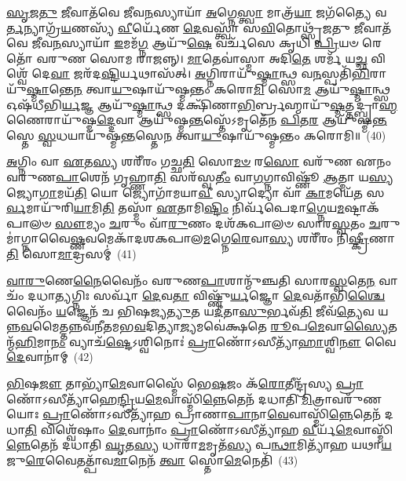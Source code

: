 \-\ul{𑌸𑍃}\-\-\ul{𑌜}\-\-\ul{𑌤𑍁} \ul{𑌜𑍀}\-𑌵𑌾𑌤᳴𑌵𑍇 𑌜𑍀𑌵\-\ul{𑌨}\-𑌸𑍍𑌯𑌾𑌯𑌾᳴ \ul{𑌅}\-𑌗𑍍𑌨𑍇\-\ul{𑌸𑍍𑌤𑍍𑌵𑌾} 𑌮𑌾𑌤𑍍𑌰᳴\-\ul{𑌯𑌾} 𑌜𑌗᳴𑌤𑍍𑌯𑍈 𑌵\-\ul{𑌰𑍍𑌤}\-𑌨𑍍𑌯𑌾𑌗𑍍𑌰᳴\-\ul{𑌯}\-𑌣𑌸𑍍𑌯᳴ \ul{𑌵𑍀}\-𑌰𑍍𑌯𑍇᳴𑌣 \ul{𑌦𑍇}\-𑌵𑌸𑍍𑌤𑍍𑌵𑌾᳴ 𑌸\-\ul{𑌵𑌿}\-𑌤𑍋𑌥𑍍𑌸𑍃᳴𑌜𑌤𑍁 \ul{𑌜𑍀}\-𑌵𑌾𑌤᳴𑌵𑍇 𑌜𑍀𑌵\-\ul{𑌨}\-𑌸𑍍𑌯𑌾𑌯𑌾᳴ \ul{𑌇}\-𑌮𑌮᳴\-\ul{𑌗𑍍𑌨} 𑌆𑌯𑍁᳴\-\ul{𑌷𑍇} 𑌵𑌰𑍍𑌚᳴𑌸𑍇 𑌕𑍃𑌧𑌿 \ul{𑌪𑍍𑌰𑌿}\-𑌯𑍞 𑌰𑍇𑌤𑍋᳴ 𑌵𑌰𑍁𑌣 𑌸𑍋𑌮 𑌰𑌾𑌜𑌨𑍍𑌨𑍍। \ul{𑌮𑌾}\-𑌤𑍇𑌵𑌾॑𑌸𑍍𑌮𑌾 𑌅𑌦𑌿\-\ul{𑌤𑍇} 𑌶𑌰𑍍𑌮᳴ 𑌯\-\ul{𑌚𑍍𑌛} 𑌵𑌿𑌶𑍍𑌵𑍇᳴ 𑌦𑍇\-\ul{𑌵𑌾} 𑌜𑌰᳴𑌦\-\ul{𑌷𑍍𑌟𑌿}\-𑌰𑍍𑌯𑌥𑌾𑌸᳴𑌤𑍍। \ul{𑌅}\-𑌗𑍍𑌨𑌿𑌰𑌾𑌯𑍁᳴\-\ul{𑌷𑍍𑌮𑌾}\-𑌨𑍍𑌥𑍍𑌸 𑌵\-\ul{𑌨}\-𑌸𑍍𑌪𑌤𑌿᳴\-\ul{𑌭𑌿}\-𑌰𑌾𑌯𑍁᳴\-\ul{𑌷𑍍𑌮𑌾}\-𑌨𑍍𑌤𑍇\-\ul{𑌨} 𑌤𑍍𑌵𑌾\-\ul{𑌯𑍁}\-𑌷𑌾𑌯𑍁᳴𑌷𑍍𑌮𑌨𑍍𑌤𑌂 𑌕𑌰𑍋\-\ul{𑌮𑌿} 𑌸𑍋\-\ul{𑌮} 𑌆𑌯𑍁᳴\-\ul{𑌷𑍍𑌮𑌾}\-𑌨𑍍𑌥𑍍𑌸 𑌓𑌷᳴𑌧𑍀𑌭𑌿\-\ul{𑌰𑍍𑌯}\-𑌜𑍍𑌞 𑌆𑌯𑍁᳴\-\ul{𑌷𑍍𑌮𑌾}\-𑌨𑍍𑌥𑍍𑌸 𑌦𑌕𑍍𑌷𑌿᳴𑌣𑌾\-\ul{𑌭𑌿}\-𑌰𑍍𑌬𑍍𑌰𑌹𑍍𑌮𑌾𑌯𑍁᳴\-\ul{𑌷𑍍𑌮}\-𑌤𑍍𑌤𑌦𑍍𑌬𑍍𑌰𑌾॑\-\ul{𑌹𑍍𑌮}\-𑌣𑍈𑌰𑌾𑌯𑍁᳴𑌷𑍍𑌮\-\ul{𑌦𑍍𑌦𑍇}\-𑌵𑌾 𑌆𑌯𑍁᳴𑌷𑍍𑌮\-\ul{𑌨𑍍𑌤}\-𑌸𑍍𑌤𑍇᳴\-𑌽𑌮𑍃𑌤𑍇᳴𑌨 \ul{𑌪𑌿}\-𑌤\-\ul{𑌰} 𑌆𑌯𑍁᳴𑌷𑍍𑌮\-\ul{𑌨𑍍𑌤}\-𑌸𑍍𑌤𑍇 \ul{𑌸𑍍𑌵}\-𑌧𑌯𑌾𑌯𑍁᳴𑌷𑍍𑌮\-\ul{𑌨𑍍𑌤}\-𑌸𑍍𑌤𑍇\-\ul{𑌨} 𑌤𑍍𑌵𑌾\-\ul{𑌯𑍁}\-𑌷𑌾𑌯𑍁᳴𑌷𑍍𑌮𑌨𑍍𑌤𑌂 𑌕𑌰𑍋𑌮𑌿॥~(40)

{\anuvakamend[{𑌵𑌿𑌶𑍍𑌵𑍇᳴𑌷𑌾𑌂 \ul{𑌦𑍇}\-𑌵𑌾𑌨𑌾𑌂॑ \ul{𑌪𑍍𑌰𑌾}\-𑌣𑍋᳴\-𑌽𑌸𑌿 \ul{𑌤𑍍𑌰𑌿}\-𑌷𑍍𑌟𑍁𑌭𑍋᳴ 𑌵\-\ul{𑌰𑍍𑌤}\-𑌨𑍍𑌯𑌾 \ul{𑌶𑍁}\-𑌕𑍍𑌰𑌸𑍍𑌯᳴ \ul{𑌵𑍀}\-𑌰𑍍𑌯𑍇᳴𑌣 \ul{𑌦𑍇}\-𑌵𑌸𑍍𑌤𑍍𑌵𑌾᳴ 𑌸\-\ul{𑌵𑌿}\-𑌤𑍋𑌥𑍍𑌸𑍋\-\ul{𑌮} 𑌆𑌯𑍁᳴\-\ul{𑌷𑍍𑌮𑌾}\-𑌨𑍍𑌪𑌞𑍍𑌚᳴𑌵𑌿𑍞𑌶𑌤𑌿𑌶𑍍𑌚}]}%

\-\ul{𑌅}\-𑌗𑍍𑌨𑌿𑌂 𑌵𑌾 \ul{𑌏}\-𑌤\-\ul{𑌸𑍍𑌯} 𑌶𑌰𑍀᳴𑌰𑌂 𑌗𑌚𑍍𑌛\-\ul{𑌤𑌿} 𑌸𑍋\-\ul{𑌮}\-\-\ul{𑍞} 𑌰\-\ul{𑌸𑍋} 𑌵𑌰𑍁᳴𑌣 𑌏𑌨𑌂 𑌵𑌰𑍁𑌣\-\ul{𑌪𑌾}\-𑌶𑍇𑌨᳴ 𑌗𑍃𑌹𑍍𑌣𑌾\-\ul{𑌤𑌿} 𑌸𑌰᳴𑌸𑍍𑌵\-\ul{𑌤𑍀𑌂} 𑌵𑌾\-\ul{𑌗}\-𑌗𑍍𑌨𑌾𑌵𑌿𑌷𑍍𑌣𑍂᳴ \ul{𑌆}\-𑌤𑍍𑌮𑌾 𑌯\-\ul{𑌸𑍍𑌯} 𑌜𑍍𑌯𑍋\-\ul{𑌗𑌾}\-𑌮𑌯᳴\-\ul{𑌤𑌿} 𑌯𑍋 𑌜𑍍𑌯𑍋𑌗𑌾᳴𑌮𑌯𑌾\-\ul{𑌵𑍀} 𑌸𑍍𑌯𑌾𑌦𑍍𑌯𑍋 𑌵𑌾᳴ \ul{𑌕𑌾}\-𑌮𑌯𑍇᳴\-\ul{𑌤} 𑌸\-\ul{𑌰𑍍𑌵}\-𑌮𑌾𑌯𑍁᳴𑌰𑌿\-\ul{𑌯𑌾}\-𑌮𑌿\-\ul{𑌤𑌿} 𑌤𑌸𑍍𑌮𑌾᳴ \ul{𑌏}\-𑌤𑌾𑌮𑌿\-\ul{𑌷𑍍𑌟𑌿𑌂} 𑌨𑌿𑌰𑍍𑌵᳴𑌪𑍇𑌦𑌾\-\ul{𑌗𑍍𑌨𑍇}\-𑌯\-\ul{𑌮}\-𑌷𑍍𑌟𑌾𑌕᳴𑌪𑌾𑌲𑍞 \ul{𑌸𑍗}\-𑌮𑍍𑌯𑌂 \ul{𑌚}\-𑌰𑍁𑌂 𑌵𑌾᳴\-\ul{𑌰𑍁}\-𑌣𑌂 𑌦𑌶᳴\-𑌕𑌪𑌾𑌲𑍞 𑌸𑌾𑌰\-\ul{𑌸𑍍𑌵}\-𑌤𑌂 \ul{𑌚}\-𑌰𑍁𑌮𑌾॑𑌗𑍍𑌨𑌾𑌵𑍈\-\ul{𑌷𑍍𑌣}\-𑌵𑌮𑍇𑌕𑌾᳴\-𑌦𑌶\-𑌕𑌪𑌾𑌲\-\ul{𑌮}\-𑌗𑍍𑌨𑍇\-\ul{𑌰𑍇}\-𑌵𑌾\-\ul{𑌸𑍍𑌯} 𑌶𑌰𑍀᳴𑌰𑌂 𑌨𑌿\-\ul{𑌷𑍍𑌕𑍍𑌰𑍀}\-𑌣𑌾\-\ul{𑌤𑌿} 𑌸𑍋\-\ul{𑌮𑌾}\-𑌦𑍍𑌰𑌸𑌮𑍍॑~(41)

\-\ul{𑌵𑌾}\-\-\ul{𑌰𑍁}\-𑌣𑍇\-\ul{𑌨𑍈}\-𑌵𑍈𑌨𑌂᳴ 𑌵𑌰𑍁𑌣\-\ul{𑌪𑌾}\-𑌶𑌾𑌨𑍍𑌮𑍁᳴𑌞𑍍𑌚𑌤𑌿 𑌸𑌾𑌰\-\ul{𑌸𑍍𑌵}\-𑌤𑍇\-\ul{𑌨} 𑌵𑌾𑌚𑌂᳴ 𑌦𑌧𑌾\-\ul{𑌤𑍍𑌯}\-𑌗𑍍𑌨𑌿𑌃 𑌸𑌰𑍍𑌵𑌾᳴ \ul{𑌦𑍇}\-𑌵\-\ul{𑌤𑌾} 𑌵𑌿𑌷𑍍𑌣𑍁᳴\-\ul{𑌰𑍍𑌯}\-𑌜𑍍𑌞𑍋 \ul{𑌦𑍇}\-𑌵𑌤𑌾᳴𑌭𑌿\-\ul{𑌶𑍍𑌚𑍈}\-𑌵𑍈𑌨𑌂᳴ \ul{𑌯}\-𑌜𑍍𑌞𑍇𑌨᳴ 𑌚 𑌭𑌿𑌷𑌜𑍍𑌯\-\ul{𑌤𑍍𑌯𑍁}\-𑌤 𑌯\-\ul{𑌦𑍀}\-𑌤𑌾\-\ul{𑌸𑍁}\-𑌰𑍍𑌭𑌵᳴\-\ul{𑌤𑌿} 𑌜𑍀𑌵᳴\-\ul{𑌤𑍍𑌯𑍇}\-𑌵 𑌯𑌨𑍍𑌨\-\ul{𑌵}\-𑌮𑍈𑌤𑍍𑌤𑌨𑍍𑌨𑌵᳴𑌨𑍀𑌤𑌮𑌭\-\ul{𑌵}\-𑌦𑌿𑌤𑍍𑌯𑌾\-\ul{𑌜𑍍𑌯}\-𑌮𑌵𑍇॑𑌕𑍍𑌷𑌤𑍇 \ul{𑌰𑍂}\-𑌪\-\ul{𑌮𑍇}\-𑌵𑌾\-\ul{𑌸𑍍𑌯𑍈}\-𑌤𑌨𑍍𑌮᳴\-\ul{𑌹𑌿}\-𑌮𑌾\-\ul{𑌨𑌂} 𑌵𑍍𑌯𑌾𑌚᳴\-\ul{𑌷𑍍𑌟𑍇}\-\-𑌽𑌶𑍍𑌵𑌿𑌨𑍋𑌃॑ \ul{𑌪𑍍𑌰𑌾}\-𑌣𑍋᳴\-𑌽𑌸𑍀𑌤𑍍𑌯𑌾᳴\-\ul{𑌹𑌾}\-𑌶𑍍𑌵𑌿\-\ul{𑌨𑍗} 𑌵𑍈 \ul{𑌦𑍇}\-𑌵𑌾𑌨𑌾॑𑌮𑍍~(42)

\-\ul{𑌭𑌿}\-𑌷\-\ul{𑌜𑍗} 𑌤𑌾𑌭𑍍𑌯𑌾᳴\-\ul{𑌮𑍇}\-𑌵𑌾𑌸𑍍𑌮𑍈᳴ 𑌭𑍇\-\ul{𑌷}\-𑌜𑌂 𑌕᳴\-\ul{𑌰𑍋}\-𑌤𑍀𑌨𑍍𑌦𑍍𑌰᳴𑌸𑍍𑌯 \ul{𑌪𑍍𑌰𑌾}\-𑌣𑍋᳴\-𑌽𑌸𑍀𑌤𑍍𑌯𑌾᳴𑌹𑍇\-\ul{𑌨𑍍𑌦𑍍𑌰𑌿}\-𑌯\-\ul{𑌮𑍇}\-𑌵𑌾𑌸𑍍𑌮𑌿᳴\-\ul{𑌨𑍍𑌨𑍇}\-𑌤𑍇𑌨᳴ 𑌦𑌧𑌾𑌤𑌿 \ul{𑌮𑌿}\-𑌤𑍍𑌰𑌾𑌵𑌰𑍁᳴𑌣𑌯𑍋𑌃 \ul{𑌪𑍍𑌰𑌾}\-𑌣𑍋᳴\-𑌽𑌸𑍀𑌤𑍍𑌯𑌾᳴𑌹 𑌪𑍍𑌰𑌾𑌣𑌾\-\ul{𑌪𑌾}\-𑌨𑌾\-\ul{𑌵𑍇}\-𑌵𑌾𑌸𑍍𑌮𑌿᳴\-\ul{𑌨𑍍𑌨𑍇}\-𑌤𑍇𑌨᳴ 𑌦𑌧𑌾\-\ul{𑌤𑌿} 𑌵𑌿𑌶𑍍𑌵𑍇᳴𑌷𑌾𑌂 \ul{𑌦𑍇}\-𑌵𑌾𑌨𑌾𑌂॑ \ul{𑌪𑍍𑌰𑌾}\-𑌣𑍋᳴\-𑌽𑌸𑍀𑌤𑍍𑌯𑌾᳴𑌹 \ul{𑌵𑍀}\-𑌰𑍍𑌯᳴\-\ul{𑌮𑍇}\-𑌵𑌾𑌸𑍍𑌮𑌿᳴\-\ul{𑌨𑍍𑌨𑍇}\-𑌤𑍇𑌨᳴ 𑌦𑌧𑌾𑌤𑌿 \ul{𑌘𑍃}\-𑌤\-\ul{𑌸𑍍𑌯} 𑌧𑌾𑌰𑌾᳴\-\ul{𑌮}\-𑌮𑍃𑌤᳴\-\ul{𑌸𑍍𑌯} 𑌪\-\ul{𑌨𑍍𑌥𑌾}\-𑌮𑌿𑌤𑍍𑌯𑌾᳴𑌹 𑌯𑌥𑌾\-\ul{𑌯}\-𑌜𑍁\-\ul{𑌰𑍇}\-𑌵𑍈𑌤𑌤𑍍𑌪𑌾᳴𑌵\-\ul{𑌮𑌾}\-𑌨𑍇𑌨᳴ \ul{𑌤𑍍𑌵𑌾} 𑌸𑍍𑌤𑍋\-\ul{𑌮𑍇}\-𑌨𑍇𑌤𑌿᳴~(43)

